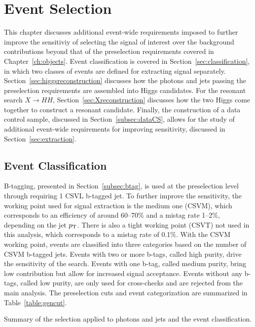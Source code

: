 \chapter{Event Selection\label{ch:selection}}

This chapter discusses additional event-wide requirements imposed to further
improve the sensitiviy of selecting the signal of interest over the background contributions
beyond that of the preselection requirements covered in Chapter~\ref{ch:objects}.
Event classification is covered in Section~\ref{sec:classification}, in which two classes of
events are defined for extracting signal separately.
Section~\ref{sec:higgsreconstruction} discusses how the photons and jets passing the preselection
requirements are assembled into Higgs candidates. For the resonant search $X\rightarrow HH$,
Section~\ref{sec:Xreconstruction} discusses how the two Higgs come together to construct a resonant
candidate. Finally, the construction of a data control
sample, discussed in Section~\ref{subsec:dataCS}, allows for the study of additional event-wide
requirements for improving sensitivity, discussed in Section~\ref{sec:extraction}.

\section{Event Classification\label{sec:classification}}

B-tagging, presented in Section~\ref{subsec:btag}, is used at the preselection level through
requiring 1 CSVL b-tagged jet. To further improve the sensitivity, the working point used for
signal extraction is the medium one (CSVM), which corresponds to an efficiency of around 60--70\%
and a mistag rate 1--2\%, depending on the jet $p_{\rm T}$.
There is also a tight working point (CSVT) not used in this analysis,
which corresponds to a mistag rate of 0.1\%.
With the CSVM working point, events are classified into three categories
based on the number of CSVM b-tagged jets. Events with two or more b-tags, called high purity,
drive the sensitivity of the search. Events with one b-tag, called medium purity,
bring low contribution but allow for increased signal acceptance. Events without any b-tags,
called low purity, are only used for cross-checks and are rejected from the main analysis.
The preselection cuts and event categorization
are summarized in Table~\ref{table:gencut}.

\begin{table}[ht]
  \centering
  \renewcommand{\arraystretch}{1.4}
  \caption{Summary of the selection applied to photons and jets and the event classification.}
  
  \label{table:gencut}
\end{table}

